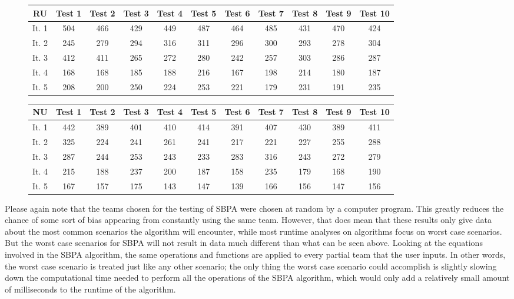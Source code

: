 \documentclass{article}
\begin{document}
\begin{figure}[H]
	\begin{tabular}{c||c|c|c|c|c|c|c|c|c|c}
		RU&Test 1&Test 2&Test 3&Test 4&Test 5&Test 6&Test 7&Test 8&Test 9&Test 10\\
		\hline\hline
		It. 1&504&466&429&449&487&464&485&431&470&424\\
		It. 2&245&279&294&316&311&296&300&293&278&304\\
		It. 3&412&411&265&272&280&242&257&303&286&287\\
		It. 4&168&168&185&188&216&167&198&214&180&187\\
		It. 5&208&200&250&224&253&221&179&231&191&235\\
	\end{tabular}
	\centering
\end{figure}
\begin{figure}[H]
	\begin{tabular}{c||c|c|c|c|c|c|c|c|c|c}
		NU&Test 1&Test 2&Test 3&Test 4&Test 5&Test 6&Test 7&Test 8&Test 9&Test 10\\
		\hline\hline
		It. 1&442&389&401&410&414&391&407&430&389&411\\
		It. 2&325&224&241&261&241&217&221&227&255&288\\
		It. 3&287&244&253&243&233&283&316&243&272&279\\
		It. 4&215&188&237&200&187&158&235&179&168&190\\
		It. 5&167&157&175&143&147&139&166&156&147&156\\
	\end{tabular}
	\centering
\end{figure}
Please again note that the teams chosen for the testing of SBPA were chosen at random by a computer program. This greatly reduces the chance of some sort of bias appearing from constantly using the same team. However, that does mean that these results only give data about the most common scenarios the algorithm will encounter, while most runtime analyses on algorithms focus on worst case scenarios. But the worst case scenarios for SBPA will not result in data much different than what can be seen above. Looking at the equations involved in the SBPA algorithm, the same operations and functions are applied to every partial team that the user inputs. In other words, the worst case scenario is treated just like any other scenario; the only thing the worst case scenario could accomplish is slightly slowing down the computational time needed to perform all the operations of the SBPA algorithm, which would only add a relatively small amount of milliseconds to the runtime of the algorithm.\\\\
\end{document}
